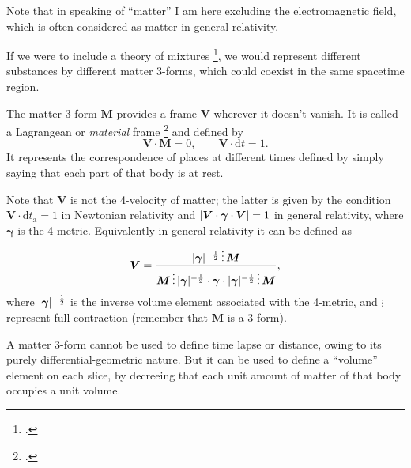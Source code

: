 \documentclass[\ifafour a4paper,12pt,\else a5paper,10pt,\fi%
onecolumn,oneside,article,%
british%
]{memoir}
\theoremstyle{remark}
\theoremstyle{innote}
\newcommand*{\citep}{\footcites}
\newcommand*{\di}{\mathrm{d}}%
\DeclarePairedDelimiter\abs{\lvert}{\rvert}
\renewcommand*{\|}[1][]{\nonscript\,#1\vert\nonscript\;\mathopen{}}
\newcommand*{\eg}{{e.g.}}
\newcommand*{\yrr}{M}
\newcommand*{\yr}{\bm{\yrr}}
\newcommand*{\ytn}{t_{\textrm{a}}}
\newcommand*{\yffg}{\gamma}
\newcommand*{\yfg}{\bm{\yffg}}
\newcommand*{\ynn}{V}
\newcommand*{\yn}{\bm{\ynn}}
\begin{document}
Note that in speaking of \enquote{matter} I am here excluding the
electromagnetic field, which is often considered as matter in general
relativity.

If we were to include a theory of mixtures
\citep[\eg][app.~5B]{truesdell1969_r1984}, we would represent different
substances by different matter 3-forms, which could coexist in the same
spacetime region.


The matter 3-form $\yr$ provides a frame $\yn$ wherever it doesn't vanish.
It is called a Lagrangean or \emph{material} frame
\citep{smarretal1978,smarretal1980} and defined by
\begin{equation}
  \label{eq:eulerian_frame_conditions}
  \yn \cdot \yr = 0, \qquad \yn \cdot \di t = 1.
\end{equation}
It represents the correspondence of places at different times defined by
simply saying that each part of that body is at rest.

Note that $\yn$ is not the 4-velocity of matter; the latter is given by the
condition $\yn\cdot \di\ytn = 1$ in Newtonian relativity and
$\abs{\yn\cdot\yfg\cdot\yn} = 1$ in general relativity, where $\yfg$ is the
4-metric. Equivalently in general relativity it can be defined as
\begin{equation}
  \label{eq:4velocity_explicit}
  \yn = \frac{\abs{\yfg}^{-\frac{1}{2}}\vdots \yr}{\yr\vdots\abs{\yfg}^{-\frac{1}{2}}\cdot\yfg\cdot\abs{\yfg}^{-\frac{1}{2}}\vdots \yr},
\end{equation}
where $\abs{\yfg}^{-\frac{1}{2}}$ is the inverse volume element associated
with the 4-metric, and $\vdots$ represent full contraction (remember that
$\yr$ is a 3-form).


A matter 3-form cannot be used to define time lapse or distance, owing to
its purely differential-geometric nature. But it can be used to define a
\enquote{volume} element on each slice, by decreeing that each unit amount
of matter of that body occupies a unit volume.
\end{document}

